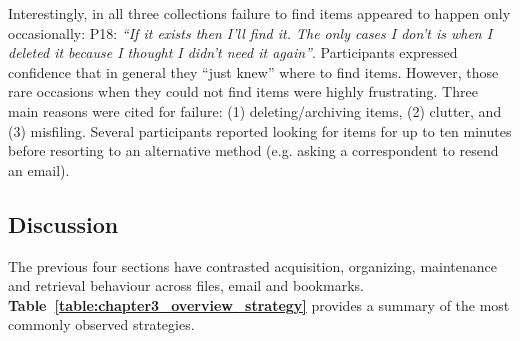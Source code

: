 Interestingly, in all three collections failure to find items appeared to happen only occasionally: P18: \textit{``If it exists then I'll find it. The only cases I don't is when I deleted it because I thought I didn't need it again''}. Participants expressed confidence that in general they ``just knew'' where to find items. However, those rare occasions when they could not find items were highly frustrating. Three main reasons were cited for failure: (1) deleting/archiving items, (2) clutter, and (3) misfiling.
Several participants reported looking for items for up to ten minutes before resorting to an alternative method (e.g. asking a correspondent to resend an email).






\subsection{Discussion}
\label{exp-study:Results-comparison-summary}

The previous four sections have contrasted acquisition, organizing, maintenance and retrieval behaviour across files, email and bookmarks.  \textbf{Table~\ref{table:chapter3_overview_strategy}} provides a summary of the most commonly observed strategies. %

